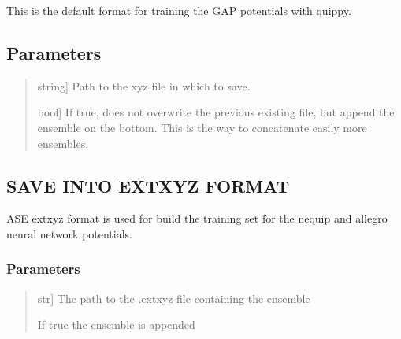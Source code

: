 \documentclass[a4paper,11pt,english]{sphinxmanual}
\begin{document}
\begin{fulllineitems}
\begin{fulllineitems}
\sphinxAtStartPar
This is the default format for training the GAP potentials with quippy.


\subsection{Parameters}
\label{\detokenize{apireference:id23}}\begin{quote}
\begin{description}
\sphinxlineitem{filename}{[}string{]}
\sphinxAtStartPar
Path to the xyz file in which to save.

\sphinxlineitem{append\_mode}{[}bool{]}
\sphinxAtStartPar
If true, does not overwrite the previous existing file, but append the ensemble on the bottom.
This is the way to concatenate easily more ensembles.

\end{description}
\end{quote}

\end{fulllineitems}


\begin{fulllineitems}
\label{\detokenize{apireference:sscha.Ensemble.Ensemble.save_extxyz}}
\pysigstartsignatures
{}
\pysigstopsignatures

\subsection{SAVE INTO EXTXYZ FORMAT}
\label{\detokenize{apireference:save-into-extxyz-format}}
\sphinxAtStartPar
ASE extxyz format is used for build the training set for the nequip and allegro neural network potentials.


\subsubsection{Parameters}
\label{\detokenize{apireference:id24}}\begin{quote}
\begin{description}
\sphinxlineitem{filename}{[}str{]}
\sphinxAtStartPar
The path to the .extxyz file containing the ensemble

\sphinxAtStartPar
If true the ensemble is appended


\end{description}
\end{quote}
\end{fulllineitems}
\end{fulllineitems}
\end{document}

